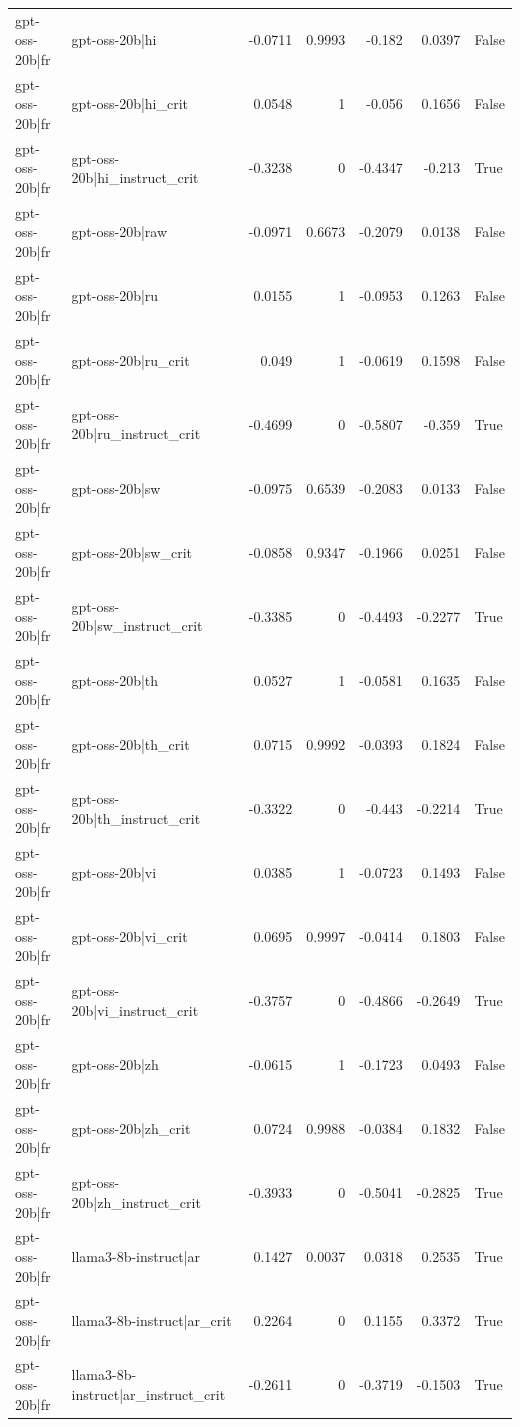 \begin{table}
\begin{tabular}{l l r r r r l}
gpt-oss-20b|fr & gpt-oss-20b|hi & -0.0711 & 0.9993 & -0.182 & 0.0397 & False \\
gpt-oss-20b|fr & gpt-oss-20b|hi_crit & 0.0548 & 1 & -0.056 & 0.1656 & False \\
gpt-oss-20b|fr & gpt-oss-20b|hi_instruct_crit & -0.3238 & 0 & -0.4347 & -0.213 & True \\
gpt-oss-20b|fr & gpt-oss-20b|raw & -0.0971 & 0.6673 & -0.2079 & 0.0138 & False \\
gpt-oss-20b|fr & gpt-oss-20b|ru & 0.0155 & 1 & -0.0953 & 0.1263 & False \\
gpt-oss-20b|fr & gpt-oss-20b|ru_crit & 0.049 & 1 & -0.0619 & 0.1598 & False \\
gpt-oss-20b|fr & gpt-oss-20b|ru_instruct_crit & -0.4699 & 0 & -0.5807 & -0.359 & True \\
gpt-oss-20b|fr & gpt-oss-20b|sw & -0.0975 & 0.6539 & -0.2083 & 0.0133 & False \\
gpt-oss-20b|fr & gpt-oss-20b|sw_crit & -0.0858 & 0.9347 & -0.1966 & 0.0251 & False \\
gpt-oss-20b|fr & gpt-oss-20b|sw_instruct_crit & -0.3385 & 0 & -0.4493 & -0.2277 & True \\
gpt-oss-20b|fr & gpt-oss-20b|th & 0.0527 & 1 & -0.0581 & 0.1635 & False \\
gpt-oss-20b|fr & gpt-oss-20b|th_crit & 0.0715 & 0.9992 & -0.0393 & 0.1824 & False \\
gpt-oss-20b|fr & gpt-oss-20b|th_instruct_crit & -0.3322 & 0 & -0.443 & -0.2214 & True \\
gpt-oss-20b|fr & gpt-oss-20b|vi & 0.0385 & 1 & -0.0723 & 0.1493 & False \\
gpt-oss-20b|fr & gpt-oss-20b|vi_crit & 0.0695 & 0.9997 & -0.0414 & 0.1803 & False \\
gpt-oss-20b|fr & gpt-oss-20b|vi_instruct_crit & -0.3757 & 0 & -0.4866 & -0.2649 & True \\
gpt-oss-20b|fr & gpt-oss-20b|zh & -0.0615 & 1 & -0.1723 & 0.0493 & False \\
gpt-oss-20b|fr & gpt-oss-20b|zh_crit & 0.0724 & 0.9988 & -0.0384 & 0.1832 & False \\
gpt-oss-20b|fr & gpt-oss-20b|zh_instruct_crit & -0.3933 & 0 & -0.5041 & -0.2825 & True \\
gpt-oss-20b|fr & llama3-8b-instruct|ar & 0.1427 & 0.0037 & 0.0318 & 0.2535 & True \\
gpt-oss-20b|fr & llama3-8b-instruct|ar_crit & 0.2264 & 0 & 0.1155 & 0.3372 & True \\
gpt-oss-20b|fr & llama3-8b-instruct|ar_instruct_crit & -0.2611 & 0 & -0.3719 & -0.1503 & True \\

\end{tabular}
\end{table}
